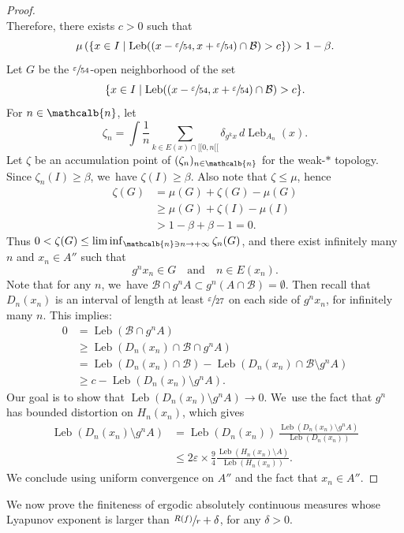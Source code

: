 \documentclass[10pt]{amsart}
\DeclareMathOperator{\Leb}{Leb}
\newcommand{\mcbn}{{\mathcalb{n}}}
\theoremstyle{definition}
\begin{document}
\begin{proof}
\[\]
Therefore, there exists $c > 0$ such that
\[
\mu \left (\{ x \in I \mid \Leb((x - \sfrac{\varepsilon}{54}, x + \sfrac{\varepsilon}{54}) \cap \mathcal{B}) > c \} \right) > 1 - \beta.
\]
Let $G$ be the $\sfrac{\varepsilon}{54}$-open neighborhood of the set
\[
\{ x \in I \mid \Leb((x - \sfrac{\varepsilon}{54}, x + \sfrac{\varepsilon}{54}) \cap \mathcal{B}) > c \}.
\]
For $n \in \mcbn$, let
\[
\zeta_n = \int \frac{1}{n} \sum_{k \in E(x) \cap [\![ 0, n [\![} \delta_{g^k x}\, d \Leb_{A_n}(x).
\]
Let $\zeta$ be an accumulation point of $(\zeta_n)_{n \in \mcbn}$ for the weak\nobreakdash-$*$ topology.
Since $\zeta_n(I) \geq \beta$, we~have $\zeta(I) \geq \beta$.
Also note that $\zeta \leq \mu$, hence
\begin{align*}
\zeta(G) &= \mu(G) + \zeta(G) - \mu(G)\\
&\geq \mu(G) + \zeta(I) - \mu(I)\\
&> 1- \beta + \beta - 1 = 0.
\end{align*}
Thus $0 < \zeta(G) \leq \liminf_{\mcbn \ni n \to +\infty} \zeta_n(G)$, and there exist infinitely many $n$ and $x_n \in A''$ such that
\[
g^n x_n \in G \quad\text{and} \quad n \in E(x_n).
\]
Note that for any $n$, we~have $\mathcal{B} \cap g^n A \subset g^n(A \cap \mathcal{B}) = \emptyset$.
Then recall that $D_n(x_n)$ is an interval of length at least $\sfrac{\varepsilon}{27}$ on each side of $g^n x_n$, for infinitely many $n$.
This implies:
\begin{align*}
0 &= \Leb(\mathcal{B} \cap g^n A)\\
&\geq \Leb(D_n(x_n) \cap \mathcal{B} \cap g^n A)\\
&= \Leb(D_n(x_n) \cap \mathcal{B}) - \Leb(D_n(x_n) \cap \mathcal{B} \setminus g^n A)\\
&\geq c - \Leb(D_n(x_n) \setminus g^n A).
\end{align*}
Our goal is to show that $\Leb(D_n(x_n) \setminus g^n A) \to 0$. We~use the fact that $g^n$ has bounded distortion on $H_n(x_n)$, which gives
\begin{align*}
\Leb(D_n(x_n) \setminus g^n A) &= \Leb(D_n(x_n))\, \frac{\Leb(D_n(x_n) \setminus g^n A)}{\Leb(D_n(x_n))}\\
&\leq 2 \varepsilon \times \frac{9}{4} \frac{\Leb(H_n(x_n) \setminus A)}{\Leb(H_n(x_n))}.
\end{align*}
We conclude using uniform convergence on $A''$ and the fact that $x_n \in A''$.
\end{proof}

We now prove the finiteness of ergodic absolutely continuous measures whose Lyapunov exponent is larger than $\sfrac{R(f)}{r} + \delta$, for any $\delta > 0$.
\end{document}
